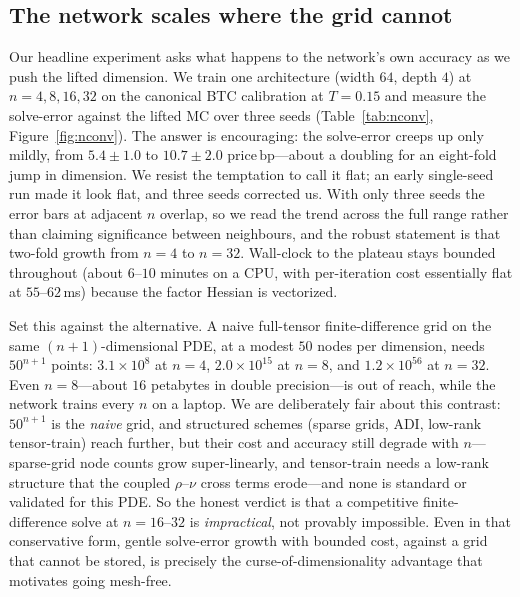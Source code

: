 \documentclass[11pt]{article}
\newcommand{\bp}{\ensuremath{\,\mathrm{bp}}}
\begin{document}
\subsection{The network scales where the grid cannot}
\label{sec:nconv}
Our headline experiment asks what happens to the network's own accuracy as we push
the lifted dimension. We train one architecture (width $64$, depth $4$) at
$n=4,8,16,32$ on the canonical BTC calibration at $T=0.15$ and measure the
solve-error against the lifted MC over three seeds (Table~\ref{tab:nconv},
Figure~\ref{fig:nconv}). The answer is encouraging: the solve-error creeps up only
mildly, from $5.4\pm1.0$ to $10.7\pm2.0$ price\bp{}---about a doubling for an
eight-fold jump in dimension. We resist the temptation to call it flat; an early
single-seed run made it look flat, and three seeds corrected us. With only three
seeds the error bars at adjacent $n$ overlap, so we read the trend across the full
range rather than claiming significance between neighbours, and the robust
statement is that two-fold growth from $n=4$ to $n=32$. Wall-clock to the plateau
stays bounded throughout (about $6$--$10$ minutes on a CPU, with per-iteration
cost essentially flat at $55$--$62\,$ms) because the factor Hessian is vectorized.

Set this against the alternative. A naive full-tensor finite-difference grid on
the same $(n{+}1)$-dimensional PDE, at a modest $50$ nodes per dimension, needs
$50^{n+1}$ points: $3.1\times10^{8}$ at $n=4$, $2.0\times10^{15}$ at $n=8$, and
$1.2\times10^{56}$ at $n=32$. Even $n=8$---about $16$ petabytes in double
precision---is out of reach, while the network trains every $n$ on a laptop. We
are deliberately fair about this contrast: $50^{n+1}$ is the \emph{naive} grid, and
structured schemes (sparse grids, ADI, low-rank tensor-train) reach further, but
their cost and accuracy still degrade with $n$---sparse-grid node counts grow
super-linearly, and tensor-train needs a low-rank structure that the coupled
$\rho$--$\nu$ cross terms erode---and none is standard or validated for this PDE.
So the honest verdict is that a competitive finite-difference solve at
$n=16$--$32$ is \emph{impractical}, not provably impossible. Even in that
conservative form, gentle solve-error growth with bounded cost, against a grid
that cannot be stored, is precisely the curse-of-dimensionality advantage that
motivates going mesh-free.
\end{document}
